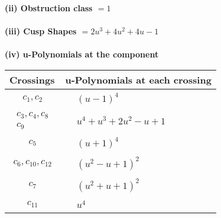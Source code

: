 \documentclass[1p]{elsarticle_modified}
\theoremstyle{definition}
\begin{document}
\flushleft \textbf{(ii) Obstruction class $= 1$}\\~\\
\flushleft \textbf{(iii) Cusp Shapes $= 2 u^3+4 u^2+4 u-1$}\\~\\
\newpage\renewcommand{\arraystretch}{1}
\flushleft \textbf{(iv) u-Polynomials at the component}\newline \\
\begin{tabular}{m{50pt}|m{274pt}}
Crossings & \hspace{64pt}u-Polynomials at each crossing \\
\hline $$\begin{aligned}c_{1},c_{2}\end{aligned}$$&$\begin{aligned}
&(u-1)^4
\end{aligned}$\\
\hline $$\begin{aligned}c_{3},c_{4},c_{8}\\c_{9}\end{aligned}$$&$\begin{aligned}
&u^4+u^3+2 u^2- u+1
\end{aligned}$\\
\hline $$\begin{aligned}c_{5}\end{aligned}$$&$\begin{aligned}
&(u+1)^4
\end{aligned}$\\
\hline $$\begin{aligned}c_{6},c_{10},c_{12}\end{aligned}$$&$\begin{aligned}
&(u^2- u+1)^2
\end{aligned}$\\
\hline $$\begin{aligned}c_{7}\end{aligned}$$&$\begin{aligned}
&(u^2+u+1)^2
\end{aligned}$\\
\hline $$\begin{aligned}c_{11}\end{aligned}$$&$\begin{aligned}
&u^4
\end{aligned}$\\
\hline
\end{tabular}\\~\\
\end{document}
